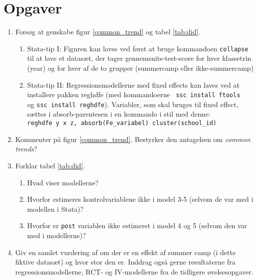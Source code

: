 \documentclass[12pt]{article}
\begin{document}
\section*{Opgaver}

\begin{enumerate}
	\item Forsøg at genskabe figur \ref{common_trend} og tabel \ref{tab:did}.
	\begin{enumerate}
	\item Stata-tip I: Figuren kan laves ved først at bruge kommandoen \verb|collapse| til at lave et datasæt, der tager gennemsnits-test-score for hver klassetrin (year) og for hver af de to grupper (summercamp eller ikke-summercamp)
	\item Stata-tip II: Regressionsmodellerne med fixed effects kan laves ved at installere pakken reghdfe (med kommandoerne \verb| ssc install ftools| \\ 
	og \verb|ssc install reghdfe|). Variabler, som skal bruges til fixed effect, sættes i absorb-parentesen i en kommando i stil med denne: \\ 
	\verb|reghdfe y x z, absorb(Fe_variabel) cluster(school_id)|
	\end{enumerate}
	\item Kommenter på figur \ref{common_trend}. Bestyrker den antagelsen om \textit{common trends}?
	\item Forklar tabel \ref{tab:did}. 
		\begin{enumerate}
		\item Hvad viser modellerne?		
		\item Hvorfor estimeres kontrolvariablene ikke i model 3-5 (selvom de var med i modellen i Stata)?
		\item Hvorfor er \verb|post| variablen ikke estimeret i model 4 og 5 (selvom den var med i modellerne)?
		\end{enumerate}
	\item Giv en samlet vurdering af om der er en effekt af summer camp (i dette fiktive datasæt) og hvor stor den er. Inddrag også gerne resultaterne fra regressionsmodellerne, RCT- og IV-modellerne fra de tidligere øvelsesopgaver.
\end{enumerate}

\end{document}
